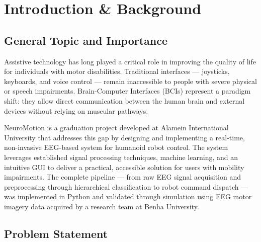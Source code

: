 \documentclass[12pt, a4paper, oneside]{report}
\begin{document}
\clearpage
\renewcommand{\listtablename}{LIST OF TABLES}
\listoftables

\clearpage
\renewcommand{\listfigurename}{LIST OF FIGURES}
\listoffigures

\clearpage
{}

\chapter{Introduction \& Background}

\section{General Topic and Importance}

Assistive technology has long played a critical role in improving the quality of life for
individuals with motor disabilities. Traditional interfaces --- joysticks, keyboards, and voice
control --- remain inaccessible to people with severe physical or speech impairments.
Brain-Computer Interfaces (BCIs) represent a paradigm shift: they allow direct communication
between the human brain and external devices without relying on muscular pathways.

NeuroMotion is a graduation project developed at Alamein International University that
addresses this gap by designing and implementing a real-time, non-invasive EEG-based system
for humanoid robot control. The system leverages established signal processing techniques,
machine learning, and an intuitive GUI to deliver a practical, accessible solution for users with
mobility impairments. The complete pipeline --- from raw EEG signal acquisition and
preprocessing through hierarchical classification to robot command dispatch --- was
implemented in Python and validated through simulation using EEG motor imagery data
acquired by a research team at Benha University.

\section{Problem Statement}
\end{document}
